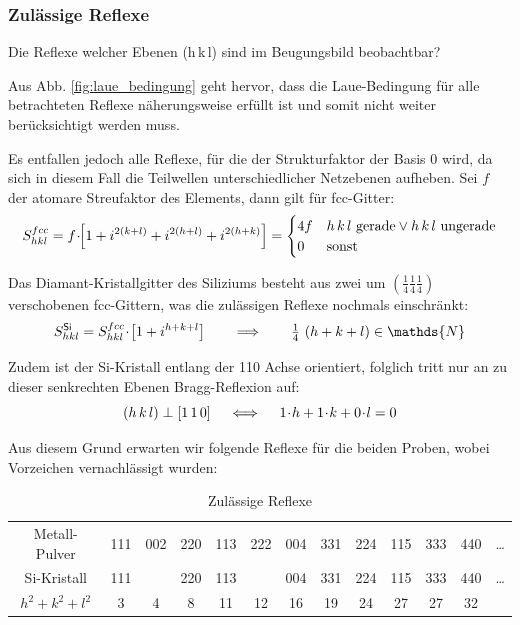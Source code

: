 \subsubsection{Zulässige Reflexe}
Die Reflexe welcher Ebenen (h\,k\,l) sind im Beugungsbild beobachtbar?

Aus Abb. \ref{fig:laue_bedingung} geht hervor, dass die Laue-Bedingung für alle betrachteten Reflexe näherungsweise erfüllt ist und somit nicht weiter berücksichtigt werden muss.

Es entfallen jedoch alle Reflexe, für die der Strukturfaktor der Basis 0 wird, da sich in diesem Fall die Teilwellen unterschiedlicher Netzebenen aufheben. Sei $f$ der atomare Streufaktor des Elements, dann gilt für fcc-Gitter:
\begin{equation}
S_{hkl}^{fcc} = f \!\cdot\!\! \left[1 + i^{2(k+l)} +  i^{2(h+l)} +  i^{2(h+k)} \right] =
\begin{cases}
4 f	& h\,k\,l \text{ gerade} \lor h\,k\,l \text{ ungerade}\\
0	& \text{sonst}
\end{cases}
\end{equation}

Das Diamant-Kristallgitter des Siliziums besteht aus zwei um $(\frac14 \frac14 \frac14)$ verschobenen fcc-Gittern, was die zulässigen Reflexe nochmals einschränkt:
\begin{equation}
S_{hkl}^\mathsf{Si} =  S_{hkl}^{fcc} \cdt \left[1 + i^{h+k+l} \right] \somit \tfrac14 ~ (h+k+l) \in \mathds{N}
\end{equation}

Zudem ist der \textsf{Si}-Kristall entlang der 110 Achse orientiert, folglich tritt nur an zu dieser senkrechten Ebenen Bragg-Reflexion auf:
\begin{equation}
(h\,k\,l) \perp [1\,1\,0]		\quad\iff\quad	1 \!\cdot\! h + 1 \!\cdot\! k + 0 \!\cdot\! l = 0
\end{equation}

Aus diesem Grund erwarten wir folgende Reflexe für die beiden Proben, wobei Vorzeichen vernachlässigt wurden:

\begin{table}[h]
\centering
\caption{Zulässige Reflexe}
\begin{tabular}{*{13}c}
	\toprule
	Metall-Pulver		& 111	& 002	& 220	& 113	& 222	& 004	& 331	& 224	& 115	& 333	& 440	& \dots	\\
	\textsf{Si}-Kristall	& 111	&		& 220	& 113	&		& 004	& 331	& 224	& 115	& 333	& 440	&  \dots	\\
	\midrule
	$h^2 + k^2 + l^2$	& 3		& 4		& 8		& 11		& 12		& 16		& 19		& 24		& 27		& 27		& 32 \\
	\bottomrule
\end{tabular}
\end{table}

